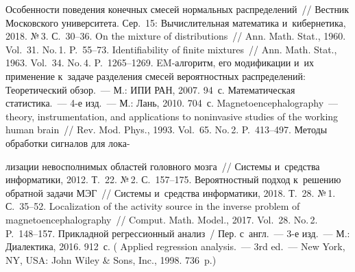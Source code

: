 \begin{multicols}{2}
{{\begin{thebibliography}{99}
Особенности поведения конечных смесей нормальных распределений~// 
Вестник Московского университета. Сер.~15: Вы\-чис\-ли\-тель\-ная математика и~кибернетика, 2018.  
№\,3. С.~30--36.
 On the mixture of distributions~// Ann. Math. Stat., 1960. Vol.~31. No.\,1. P.~55--73.
 Identifiability of finite mixtures~// 
Ann. Math. Stat., 1963. Vol.~34. No.\,4. P.~1265--1269.
 EM-ал\-го\-ритм, его модификации и~их применение к~задаче 
разделения смесей вероятностных распределений: Теоретический обзор.~--- М.: ИПИ РАН, 2007. 94~с.
 Математическая статистика.~--- 
4-е изд.~--- М.: Лань, 2010. 704~с.
Magnetoencephalography~--- theory, instrumentation, and applications to noninvasive studies of 
the working human brain~// Rev. Mod. Phys., 1993. Vol.~65. No.\,2. P.~413--497.
Методы обработки сигналов для лока-\linebreak\vspace*{-12pt}

\pagebreak

\noindent
лизации невосполнимых областей головного мозга~// 
Системы и~средства информатики, 2012. Т.~22. №\,2. С.~157--175.
Вероятностный подход к~решению обратной задачи МЭГ~// Системы и~средства информатики, 2018. Т.~28. 
№\,1. С.~35--52.
Localization of the activity source in the inverse problem of magnetoencephalography~// 
Comput. Math. Model., 2017. Vol.~28. No.\,2. P.~148--157.
 Прикладной регрессионный анализ~/
Пер. с~англ.~--- 3-е изд.~--- М.: Диалектика, 2016. 912~с.
( {Applied regression analysis}.~--- 3rd ed.~---
 New York, NY, USA: John Wiley \& Sons, Inc., 1998. 736~p.)
 \end{thebibliography}

}
}

\end{multicols}

\vspace*{-3pt}

